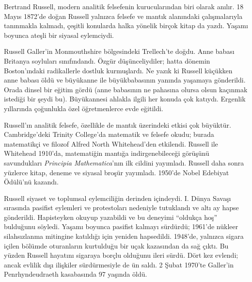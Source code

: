 




Bertrand Russell, modern analitik felsefenin kurucularından biri olarak
anılır. 18 Mayıs 1872'de doğan Russell yalnızca felsefe ve mantık alanındaki
çalışmalarıyla tanınmakla kalmadı, çeşitli konularda halka yönelik birçok
kitap da yazdı. Yaşamı boyunca ateşli bir siyasal eylemciydi.

Russell Galler'in Monmouthshire bölgesindeki Trellech'te doğdu. Anne babası
Britanya soyluları sınıfındandı. Özgür düşünceliydiler; hatta dönemin
Boston'ındaki radikallerle dostluk kurmuşlardı. Ne yazık ki Russell küçükken
anne babası öldü ve büyükanne ile büyükbabasının yanında yaşamaya gönderildi.
Orada dinsel bir eğitim gördü (anne babasının ne pahasına olursa olsun
kaçınmak istediği bir şeydi bu). Büyükannesi ahlakla ilgili her konuda çok
katıydı. Ergenlik yıllarında çoğunlukla özel öğretmenlerce evde eğitildi.

Russell'ın analitik felsefe, özellikle de mantık üzerindeki etkisi çok
büyüktür. Cambridge'deki Trinity College'da matematik ve felsefe okudu; burada
matematikçi ve filozof Alfred North Whitehead'den etkilendi. Russell ile
Whitehead 1910'da, matematiğin mantığa indirgenebileceği görüşünü savundukları
\emph{Principia Mathematica}'nın ilk cildini yayımladı. Russell daha sonra
yüzlerce kitap, deneme ve siyasal broşür yayımladı. 1950'de Nobel Edebiyat
Ödülü'nü kazandı.

Russell siyaset ve toplumsal eylemciliğin derinden içindeydi. I. Dünya Savaşı
sırasında pasifist eylemleri ve protestoları nedeniyle tutuklandı ve altı ay
hapse gönderildi. Hapisteyken okuyup yazabildi ve bu deneyimi ``oldukça hoş''
bulduğunu söyledi. Yaşamı boyunca pasifist kalmayı sürdürdü; 1961'de nükleer
silahsızlanma mitingine katıldığı için yeniden hapsedildi. 1948'de, yalnızca
sigara içilen bölümde oturanların kurtulduğu bir uçak kazasından da sağ çıktı.
Bu yüzden Russell hayatını sigaraya borçlu olduğunu ileri sürdü. Dört kez
evlendi; ancak evlilik dışı ilişkiler sürdürmesiyle de ün saldı. 2 Şubat
1970'te Galler'in Penrhyndeudraeth kasabasında 97 yaşında öldü.

